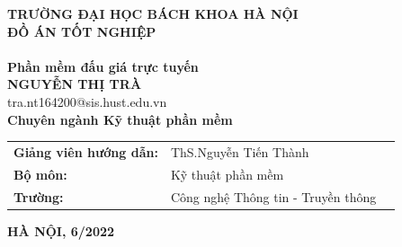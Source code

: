 \documentclass{article}
\begin{document}
\cleardoublepage
\thispagestyle{empty}
\begin{center}
\textbf{\fontsize{15pt}{0pt}\selectfont TRƯỜNG ĐẠI HỌC BÁCH KHOA HÀ NỘI}\\
\vspace{2.5cm}%
\textbf{\fontsize{25pt}{0pt}\selectfont ĐỒ ÁN TỐT NGHIỆP}\\
\hspace{10pt}\\
\textbf{\fontsize{23pt}{0pt}\selectfont Phần mềm đấu giá trực tuyến }  \vspace{1cm}\\
\textbf{\fontsize{14pt}{0pt}\selectfont NGUYỄN THỊ TRÀ }  \vspace{6pt}\\
\fontsize{13pt}{0pt}\selectfont tra.nt164200@sis.hust.edu.vn  \vspace{6pt}\\
\textbf{\fontsize{14pt}{0pt}\selectfont Chuyên ngành Kỹ thuật phần mềm }\vspace{8pt}\\
\begin{table}[H]
    \centering
    \begin{tabular}{l l l}
     \textbf{\fontsize{13pt}{0pt}\selectfont Giảng viên hướng dẫn:}& \fontsize{13pt}{0pt}\selectfont ThS.Nguyễn Tiến Thành \vspace{6pt}\\
     \textbf{\fontsize{13pt}{0pt}\selectfont Bộ môn:}& \fontsize{13pt}{0pt}\selectfont Kỹ thuật phần mềm \vspace{6pt}\\
      \textbf{\fontsize{13pt}{0pt}\selectfont Trường:}& \fontsize{13pt}{0pt}\selectfont Công nghệ Thông tin - Truyền thông
    \end{tabular}
\end{table}
\vspace{2.5cm}
\textbf{\fontsize{13pt}{0pt}\selectfont HÀ NỘI, 6/2022 }
\end{center}
\cleardoublepage
\end{document}
